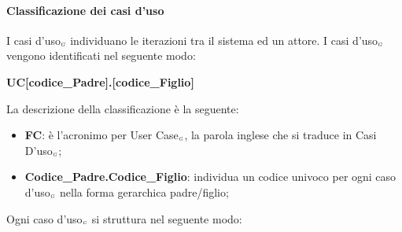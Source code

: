 \paragraph{Classificazione dei casi d'uso}\label{ProcessiPrimariProspettiveAnalisiDeiRequisitiClassificazioneDeiCasiDuso}
I casi d'uso$_{\scaleto{G}{3pt}}$ individuano le iterazioni tra il sistema ed un attore. I casi d'uso$_{\scaleto{G}{3pt}}$ vengono identificati nel seguente modo:
\begin{center}
	\textbf{UC[codice\_Padre].[codice\_Figlio]}
\end{center}
La descrizione della classificazione è la seguente:
\begin{itemize}
	\item \textbf{FC}: è l'acronimo per User Case$_{\scaleto{G}{3pt}}$, la parola inglese che si traduce in Casi D'uso$_{\scaleto{G}{3pt}}$;
	\item \textbf{Codice\_Padre.Codice\_Figlio}: individua un codice univoco per ogni caso d'uso$_{\scaleto{G}{3pt}}$ nella forma gerarchica padre/figlio;
\end{itemize}
Ogni caso d'uso$_{\scaleto{G}{3pt}}$ si struttura nel seguente modo:
